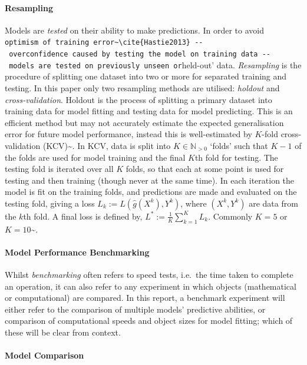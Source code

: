 \documentclass[
  letterpaper,
]{scrbook}
\let\oldparagraph\paragraph
\renewcommand{\paragraph}[1]{\oldparagraph{#1}\mbox{}}
\theoremstyle{plain}
\theoremstyle{definition}
\theoremstyle{remark}
\begin{document}
\paragraph{Resampling}

Models are \emph{tested} on their ability to make predictions. In order
to avoid
\texttt{optimism\ of\ training\ error\textquotesingle{}\textasciitilde{}\textbackslash{}cite\{Hastie2013\}\ -\/-\ overconfidence\ caused\ by\ testing\ the\ model\ on\ training\ data\ -\/-\ models\ are\ tested\ on\ previously\ unseen\ or}held-out'
data. \emph{Resampling} is the procedure of splitting one dataset into
two or more for separated training and testing. In this paper only two
resampling methods are utilised: \emph{holdout} and
\emph{cross-validation}. Holdout is the process of splitting a primary
dataset into training data for model fitting and testing data for model
predicting. This is an efficient method but may not accurately estimate
the expected generalisation error for future model performance, instead
this is well-estimated by \(K\)-fold cross-validation
(KCV)\textasciitilde{}\cite{Hastie2001}. In KCV, data is split into
\(K \in \mathbb{N}_{> 0}\) `folds' such that \(K-1\) of the folds are
used for model training and the final \(K\)th fold for testing. The
testing fold is iterated over all \(K\) folds, so that each at some
point is used for testing and then training (though never at the same
time). In each iteration the model is fit on the training folds, and
predictions are made and evaluated on the testing fold, giving a loss
\(L_k := L(\hat{g}(X^k), Y^k)\), where \((X^k, Y^k)\) are data from the
\(k\)th fold. A final loss is defined by,
\(L^* := \frac{1}{K} \sum^K_{k = 1} L_k\). Commonly \(K = 5\) or
\(K = 10\)\textasciitilde{}\cite{Breiman1992, Kohavi1995}.

\paragraph{Model Performance Benchmarking}

Whilst \emph{benchmarking} often refers to speed tests, i.e.~the time
taken to complete an operation, it can also refer to any experiment in
which objects (mathematical or computational) are compared. In this
report, a benchmark experiment will either refer to the comparison of
multiple models' predictive abilities, or comparison of computational
speeds and object sizes for model fitting; which of these will be clear
from context.

\paragraph{Model Comparison}
\end{document}
